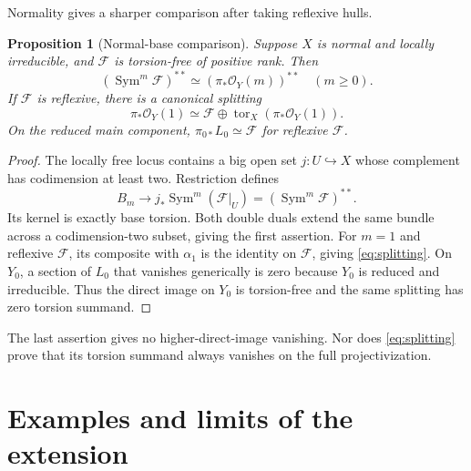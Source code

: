 \documentclass[11pt,reqno]{amsart}
\numberwithin{equation}{section}
\newtheorem{proposition}[theorem]{Proposition}
\theoremstyle{definition}
\theoremstyle{remark}
\newcommand{\OO}{\mathcal O}
\newcommand{\FF}{\mathcal F}
\newcommand{\Sym}{\operatorname{Sym}}
\newcommand{\Tor}{\operatorname{tor}}
\begin{document}
Normality gives a sharper comparison after taking reflexive hulls.
\begin{proposition}[Normal-base comparison]\label{prop:normal}
Suppose $X$ is normal and locally irreducible, and $\FF$ is torsion-free of positive rank. Then
\[
 (\Sym^m\FF)^{**}\simeq(\pi_*\OO_Y(m))^{**}\quad(m\geq0).
\]
If $\FF$ is reflexive, there is a canonical splitting
\begin{equation}\label{eq:splitting}
 \pi_*\OO_Y(1)\simeq\FF\oplus\Tor_X(\pi_*\OO_Y(1)).
\end{equation}
On the reduced main component, $\pi_{0*}L_0\simeq\FF$ for reflexive $\FF$.
\end{proposition}
\begin{proof}
The locally free locus contains a big open set $j:U\hookrightarrow X$ whose complement has codimension at least two. Restriction defines
\[
 B_m\longrightarrow j_*\Sym^m(\FF|_U)=(\Sym^m\FF)^{**}.
\]
Its kernel is exactly base torsion. Both double duals extend the same bundle across a codimension-two subset, giving the first assertion. For $m=1$ and reflexive $\FF$, its composite with $\alpha_1$ is the identity on $\FF$, giving \eqref{eq:splitting}. On $Y_0$, a section of $L_0$ that vanishes generically is zero because $Y_0$ is reduced and irreducible. Thus the direct image on $Y_0$ is torsion-free and the same splitting has zero torsion summand.
\end{proof}

The last assertion gives no higher-direct-image vanishing. Nor does \eqref{eq:splitting} prove that its torsion summand always vanishes on the full projectivization.

\section{Examples and limits of the extension}\label{sec:examples}
\end{document}
